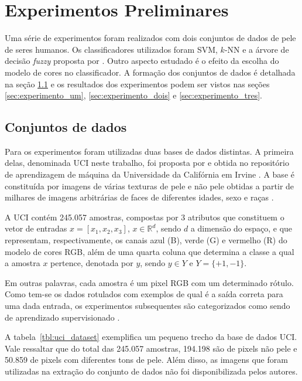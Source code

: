 \chapter{Experimentos Preliminares}
\label{cap:experimentos}

Uma série de experimentos foram realizados com dois conjuntos de dados de pele de seres humanos. Os classificadores utilizados foram SVM, $k$-NN e a árvore de decisão \emph{fuzzy} proposta por \citet{cintra:13}. Outro aspecto estudado é o efeito da escolha do modelo de cores no classificador. A formação dos conjuntos de dados é detalhada na seção \ref{sec:datasets_descricao} e os resultados dos experimentos podem ser vistos nas seções \ref{sec:experimento_um}, \ref{sec:experimento_dois} e \ref{sec:experimento_tres}.

\section{Conjuntos de dados} 
\label{sec:datasets_descricao}
Para os experimentos foram utilizadas duas bases de dados distintas. A primeira delas, denominada UCI neste trabalho, foi proposta por \citet{uci-skin-dataset:12} e obtida no repositório de aprendizagem de máquina da Universidade da Califórnia em Irvine \citep{lichman:13}. A base é constituída por imagens de várias texturas de pele e não pele obtidas a partir de milhares de imagens arbitrárias de faces de diferentes idades, sexo e raças \citep{pal-texas:04, feret:96}.

A UCI contém 245.057 amostras, compostas por 3 atributos que constituem o vetor de entradas $x = [x_1, x_2, x_3]$, $x \in \mathbb{R}^{d}$, sendo $d$ a dimensão do espaço, e que representam, respectivamente, os canais azul (B), verde (G) e vermelho (R) do modelo de cores RGB, além de uma quarta coluna que determina a classe a qual a amostra $x$ pertence, denotada por $y$, sendo $y \in Y$ e $Y = \{+1, -1\}$.

Em outras palavras, cada amostra é um pixel RGB com um determinado rótulo. Como tem-se os dados rotulados com exemplos de qual é a saída correta para uma dada entrada, os experimentos subsequentes são categorizados como sendo de aprendizado supervisionado \citep{mostafa:12}.

A tabela~\ref{tbl:uci_dataset} exemplifica um pequeno trecho da base de dados UCI. Vale ressaltar que do total das 245.057 amostras, 194.198 são de pixels não pele e 50.859 de pixels com diferentes tons de pele. Além disso, as imagens que foram utilizadas na extração do conjunto de dados não foi disponibilizada pelos autores.

